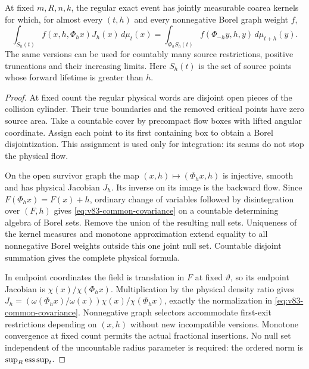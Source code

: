 \begin{proposition}
\label{prop:v83-common-kernel}
At fixed $m,R,n,k$, the regular exact event has jointly measurable
coarea kernels for which, for almost every $(t,h)$ and every nonnegative
Borel graph weight $f$,
\begin{equation}\label{eq:v83-common-covariance}
 \int_{S_h(t)}f(x,h,\Phi_hx)J_h(x)\,d\mu_t(x)
 =\int_{\Phi_hS_h(t)}f(\Phi_{-h}y,h,y)\,d\mu_{t+h}(y).
\end{equation}
The same versions can be used for countably many source restrictions,
positive truncations and their increasing limits. Here $S_h(t)$ is the
set of source points whose forward lifetime is greater than $h$.
\end{proposition}
\begin{proof}
At fixed count the regular physical words are disjoint open pieces
of the collision cylinder. Their true boundaries and the removed
critical points have zero source area. Take a countable cover by
precompact flow boxes with lifted angular coordinate. Assign each
point to its first containing box to obtain a Borel disjointization.
This assignment is used only for integration: its seams do not stop
the physical flow.

On the open survivor graph the map $(x,h)\mapsto(\Phi_hx,h)$ is
injective, smooth and has physical Jacobian $J_h$. Its inverse on
its image is the backward flow. Since $F(\Phi_hx)=F(x)+h$, ordinary
change of variables followed by disintegration over $(F,h)$ gives
\eqref{eq:v83-common-covariance} on a countable determining algebra
of Borel sets. Remove the union of the resulting null sets. Uniqueness
of the kernel measures and monotone approximation extend equality to
all nonnegative Borel weights outside this one joint null set.
Countable disjoint summation gives the complete physical formula.

In endpoint coordinates the field is translation in $F$ at fixed
$\vartheta$, so its endpoint Jacobian is $\chi(x)/\chi(\Phi_hx)$.
Multiplication by the physical density ratio gives
$J_h=(\omega(\Phi_hx)/\omega(x))\chi(x)/\chi(\Phi_hx)$, exactly
the normalization in \eqref{eq:v83-common-covariance}. Nonnegative
graph selectors accommodate first-exit restrictions depending on
$(x,h)$ without new incompatible versions. Monotone convergence at
fixed count permits the actual fractional insertions. No null set
independent of the uncountable radius parameter is required: the
ordered norm is $\sup_R\operatorname*{ess\,sup}_t$.
\end{proof}

